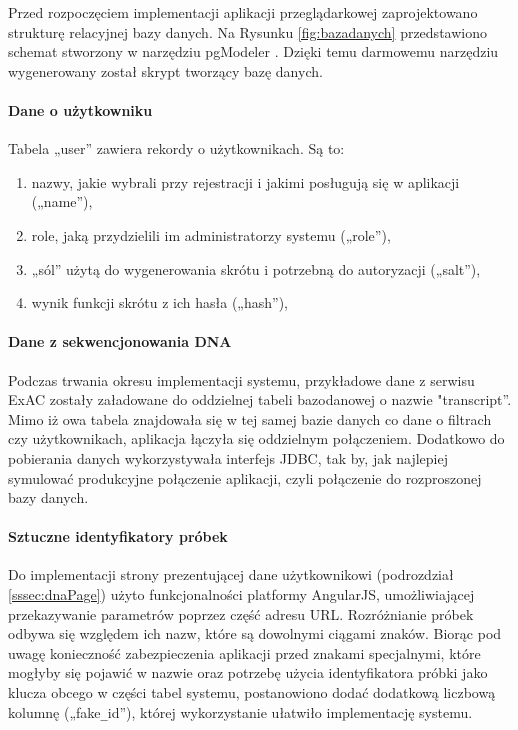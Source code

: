 \documentclass[a4paper,12pt,twoside]{article}
\begin{document}
\restoregeometry
\newpage

Przed rozpoczęciem implementacji aplikacji przeglądarkowej zaprojektowano strukturę
relacyjnej bazy danych. Na Rysunku \ref{fig:bazadanych} przedstawiono schemat stworzony
w narzędziu pgModeler \cite{pgModeler}. Dzięki temu darmowemu narzędziu wygenerowany został
skrypt tworzący bazę danych.
\paragraph{Dane o użytkowniku} Tabela „user” zawiera rekordy o użytkownikach.
Są to:
\begin{enumerate}[1)]
\item nazwy, jakie wybrali przy rejestracji i jakimi posługują się w aplikacji („name”),
\item role, jaką przydzielili im administratorzy systemu („role”),
\item „sól” użytą do wygenerowania skrótu i potrzebną do autoryzacji („salt”),
\item wynik funkcji skrótu z ich hasła („hash”),
\end{enumerate}

\paragraph{Dane z sekwencjonowania DNA} Podczas trwania okresu implementacji systemu,
przykładowe dane z serwisu ExAC zostały załadowane do oddzielnej tabeli bazodanowej o nazwie "transcript”. Mimo iż owa tabela znajdowała się w tej samej bazie danych co
dane o filtrach czy użytkownikach, aplikacja łączyła się oddzielnym połączeniem.
Dodatkowo do pobierania danych wykorzystywała interfejs JDBC, tak by, jak najlepiej
symulować produkcyjne połączenie aplikacji, czyli połączenie do rozproszonej bazy danych.

\paragraph{Sztuczne identyfikatory próbek} Do implementacji strony
prezentującej dane użytkownikowi (podrozdział \ref{sssec:dnaPage}) użyto
funkcjonalności platformy AngularJS, umożliwiającej przekazywanie parametrów
poprzez część adresu URL. Rozróżnianie próbek odbywa się względem ich nazw, które
są dowolnymi ciągami znaków. Biorąc pod uwagę konieczność zabezpieczenia aplikacji przed
znakami specjalnymi, które mogłyby się pojawić w nazwie oraz potrzebę
użycia identyfikatora próbki jako klucza obcego w części tabel systemu, postanowiono
dodać dodatkową liczbową kolumnę („fake\verb!_!id”), której wykorzystanie ułatwiło implementację systemu.
\end{document}
